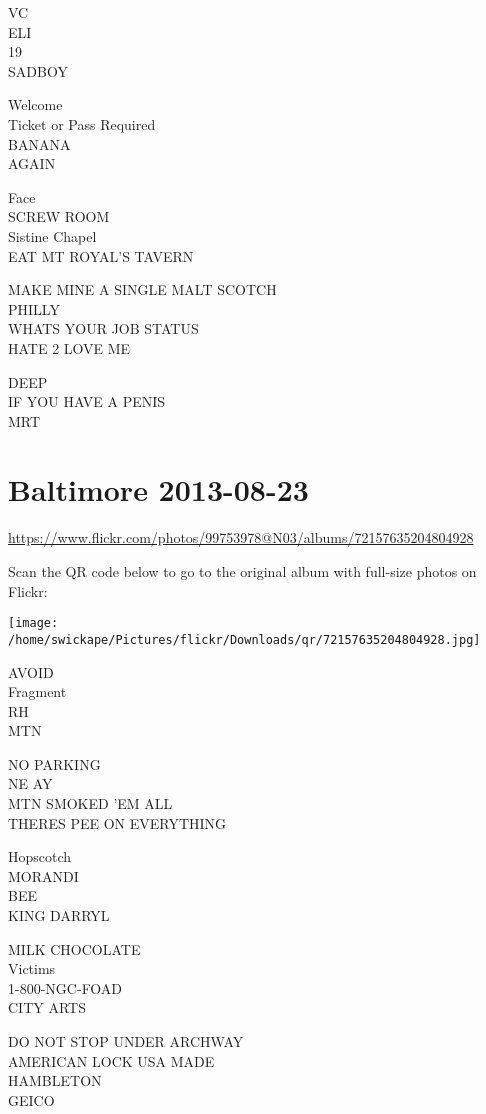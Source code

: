 \documentclass[10pt,letterpaper]{article}
\begin{document}
VC\\
ELI\\
19\\
SADBOY

Welcome\\
Ticket or Pass Required\\
BANANA\\
AGAIN

Face\\
SCREW ROOM\\
Sistine Chapel\\
EAT MT ROYAL'S TAVERN

MAKE MINE A SINGLE MALT SCOTCH\\
PHILLY\\
WHATS YOUR JOB STATUS\\
HATE 2 LOVE ME

DEEP\\
IF YOU HAVE A PENIS\\
MRT


\section*{Baltimore 2013-08-23}

\url{https://www.flickr.com/photos/99753978@N03/albums/72157635204804928}

Scan the QR code below to go to the original album with full-size photos on Flickr:

\texttt{[image: /home/swickape/Pictures/flickr/Downloads/qr/72157635204804928.jpg]}


AVOID\\
Fragment\\
RH\\
MTN

NO PARKING\\
NE AY\\
MTN SMOKED 'EM ALL\\
THERES PEE ON EVERYTHING

Hopscotch\\
MORANDI\\
BEE\\
KING DARRYL

MILK CHOCOLATE\\
Victims\\
1{-}800{-}NGC{-}FOAD\\
CITY ARTS

DO NOT STOP UNDER ARCHWAY\\
AMERICAN LOCK USA MADE\\
HAMBLETON\\
GEICO
\end{document}
